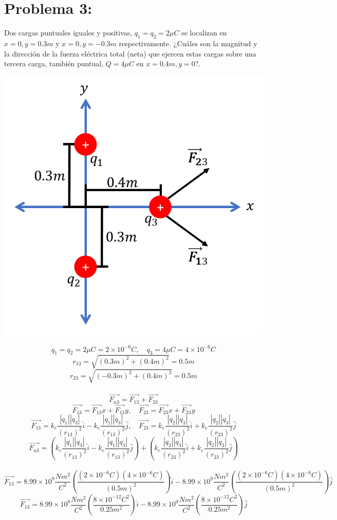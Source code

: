 \documentclass[12pt]{article}
\begin{document}
		\section{Problema 3:}\label{sec:Problema3}
			Dos cargas puntuales iguales y positivas, $ q_1 = q_2 = 2\mu C $ se localizan en $ x = 0, y =
			0.3m $ y $ x = 0, y = -0.3m $ respectivamente. ¿Cuáles son la magnitud y la dirección
			de la fuerza eléctrica total (neta) que ejercen estas cargas sobre una tercera carga,
			también puntual, $ Q = 4\mu C $ en $ x = 0.4m, y = 0 $?.
			\begin{center}
				\includegraphics[width=.5\linewidth]{Imp3t1.png} 
			\end{center}
			$$ q_1 = q_2 =  2\mu C = 2 \times 10^{-6}C, \quad q_3 = 4\mu C = 4 \times 10^{-6}C $$
			$$ r_{13} = \sqrt{(0.3m)^2 + (0.4m)^2} = 0.5m $$
			$$ r_{23} = \sqrt{(-0.3m)^2 + (0.4m)^2} = 0.5m $$ \\
			$$ \vec{F_{n3}} = \vec{F_{13}} + \vec{F_{23}} $$
			$$ \vec{F_{13}} = \vec{F_{13}}x + \vec{F_{13}}y, \quad \vec{F_{23}} = \vec{F_{23}}x + \vec{F_{23}}y$$
			$$ \vec{F_{13}} = k_e \frac{|q_1||q_3|}{(r_{13})^2} \hat{i} - k_e \frac{|q_1||q_3|}{(r_{13})^2} \hat{j}, \quad 
			\vec{F_{23}} = k_e \frac{|q_2||q_3|}{(r_{23})^2} \hat{i} + k_e \frac{|q_2||q_3|}{(r_{23})^2} \hat{j}$$
			$$ \vec{F_{n3}} = \left( k_e \frac{|q_1||q_3|}{(r_{13})^2} \hat{i} - k_e \frac{|q_1||q_3|}{(r_{13})^2} \hat{j} \right) 
			+ \left( k_e \frac{|q_2||q_3|}{(r_{23})^2} \hat{i} + k_e \frac{|q_2||q_3|}{(r_{23})^2} \hat{j} \right) $$ \\
			$$ \vec{F_{13}} = 8.99 \times 10^9 \frac{Nm^2}{C^2} \left( \frac{(2 \times 10^{-6}C)(4 \times 10^{-6}C)}{(0.5m)^2} \right) \hat{i}
			- 8.99 \times 10^9 \frac{Nm^2}{C^2} \left( \frac{(2 \times 10^{-6}C)(4 \times 10^{-6}C)}{(0.5m)^2} \right) \hat{j}  $$
			$$ \vec{F_{13}} = 8.99 \times 10^9 \frac{Nm^2}{C^2} \left( \frac{8 \times 10^{-12}C^2}{0.25m^2} \right) \hat{i}
			- 8.99 \times 10^9 \frac{Nm^2}{C^2} \left( \frac{8 \times 10^{-12}C^2}{0.25m^2} \right) \hat{j} $$
\end{document}
